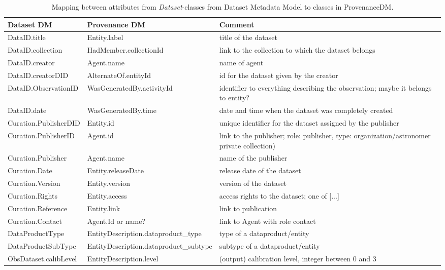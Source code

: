 \documentclass[11pt,a4paper]{ivoa}
\newcommand{\head}[1]{\textbf{#1}}
\newcommand{\class}[1]{\emph{#1}}
\begin{document}

\begin{table}[h]
\small
{}\textwidth
\begin{tabulary}{1.0\textwidth}{@{}lLp{4cm}@{}}
\toprule
\head{Dataset DM} & \head{Provenance DM} & \head{Comment}\\
\midrule
DataID.title      & Entity.label               & title of the dataset\\
DataID.collection    & HadMember.collectionId  & link to the collection to which the dataset belongs\\
DataID.creator       & Agent.name          & name of agent\\ 
DataID.creatorDID    & AlternateOf.entityId     & id for the dataset given by the creator\\
DataID.ObservationID & WasGeneratedBy.activityId  & identifier to everything describing the observation; maybe it belongs to entity?\\
DataID.date          & WasGeneratedBy.time & date and time when the dataset was completely created\\
Curation.PublisherDID  & Entity.id      & unique identifier for the dataset assigned by the publisher\\
Curation.PublisherID & Agent.id  & link to the publisher; role: publisher, type: organization/astronomer private collection)\\
Curation.Publisher     & Agent.name & name of the publisher\\
Curation.Date          & Entity.releaseDate & release date of the dataset\\
Curation.Version       & Entity.version     & version of the dataset\\
Curation.Rights        & Entity.access      & access rights to the dataset; one of [...]\\
Curation.Reference     & Entity.link        & link to publication\\
Curation.Contact       & Agent.Id or name? & link to Agent with role contact\\
DataProductType  & EntityDescription.dataproduct\_type & type of a dataproduct/entity\\
DataProductSubType & EntityDescription.dataproduct\_subtype & subtype of a dataproduct/entity\\
ObsDataset.calibLevel  & EntityDescription.level & (output) calibration level, integer between 0 and 3\\\hline
\bottomrule
\end{tabulary}
\caption{Mapping between attributes from \class{Dataset}-classes from Dataset Metadata Model to classes in ProvenanceDM.}
\label{tab:datasetmapping}
\end{table}
\end{document}
